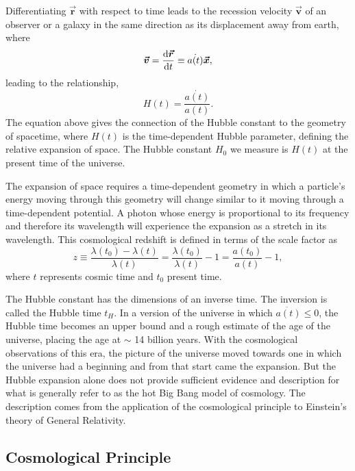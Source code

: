 Differentiating $\boldsymbol{\vec{r}}$ with respect to time leads to the recession velocity $\boldsymbol{\vec{v}}$ of an observer or a galaxy in the same direction as its displacement away from earth, where
%
\begin{equation}
  \boldsymbol{\vec{v}} = \dv{\boldsymbol{\vec{r}}}{t} \equiv  \dot{a(t)}\boldsymbol{\vec{x}},
\end{equation}
%
leading to the relationship,
%
\begin{equation}
  H(t) = \frac{\dot{a(t)}}{a(t)}.
\end{equation}
%
The equation above gives the connection of the Hubble constant to the geometry of spacetime, where $H(t)$ is the time-dependent Hubble parameter, defining the relative expansion of space. The Hubble constant $H_0$ we measure is $H(t)$ at the present time of the universe.

The expansion of space requires a time-dependent geometry in which a particle's energy moving through this geometry will change similar to it moving through a time-dependent potential. A photon whose energy is proportional to its frequency and therefore its wavelength will experience the expansion as a stretch in its wavelength. This cosmological redshift is defined in terms of the scale factor as
%
\begin{equation}
  z \equiv \frac{\lambda(t_0) - \lambda(t)}{\lambda(t)} = \frac{\lambda(t_0)}{\lambda(t)} -1 = \frac{a(t_0)}{a(t)} - 1,
\end{equation}
%
where $t$ represents cosmic time and $t_0$ present time.

The Hubble constant has the dimensions of an inverse time. The inversion is called the Hubble time $t_H$. In a version of the universe in which $\ddot{a(t)} \leq 0$, the Hubble time becomes an upper bound and a rough estimate of the age of the universe, placing the age at $\sim$ 14 billion years. With the cosmological observations of this era, the picture of the universe moved towards one in which the universe had a beginning and from that start came the expansion. But the Hubble expansion alone does not provide sufficient evidence and description for what is generally refer to as the hot Big Bang model of cosmology. The description comes from the application of the cosmological principle to Einstein's theory of General Relativity.

\subsection{Cosmological Principle}
\label{subsec:cosmological_principle}

